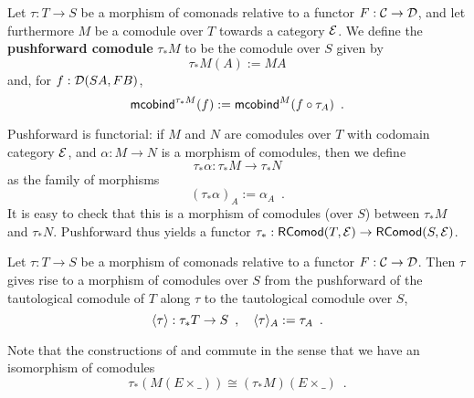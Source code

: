\documentclass{amsart}
\newcommand{\fat}[1]{\textbf{#1}}
\begin{document}
\begin{definition}\label{def:pushforward_comodule} %
  Let $\tau : T\to S$ be a morphism of comonads relative to a functor $F : \C \to \D$, and let furthermore $M$ be a 
  comodule over $T$ towards a category $\E$. We define the \fat{pushforward comodule} $\tau_*M$ to be the comodule over $S$ given by
  \[  \tau_*M(A) := MA \]
  and, for $f : \D(SA,FB)$,
   \[ \mcobind^{\tau_*M}(f) := \mcobind^M(\comp{\tau_A}{f}) \enspace . \]
   
  \noindent
  Pushforward is functorial: if $M$ and $N$ are comodules over $T$ with codomain category $\E$, and $\alpha : M\to N$ is 
    a morphism of comodules, then we define \[\tau_*\alpha : \tau_*M \to \tau_*N\] 
    as the family of morphisms
     \[ (\tau_*\alpha)_A := \alpha_A \enspace . \]
  It is easy to check that this is a morphism of comodules (over $S$) between $\tau_*M$ and $\tau_*N$.
  Pushforward thus yields a functor $\tau_*:\RComod(T,\E) \to \RComod(S,\E)$.
\end{definition}


\begin{definition} %
  Let $\tau : T\to S$ be a morphism of comonads relative to a functor $F : \C \to \D$.
  Then $\tau$ gives rise to a morphism of comodules over $S$ from the pushforward of the tautological comodule
  of $T$ along $\tau$ to the tautological comodule over $S$,
  \[ \induced{\tau} : \tau_*T \to S \enspace , \quad \induced{\tau}_A := \tau_A \enspace . \]
\end{definition}


\begin{remark}\label{rem:prod_pullback_commute}
 Note that the constructions of  and  commute in the sense that
 we have an isomorphism of comodules \[\tau_*(M(E\times \_)) \cong (\tau_*M)(E \times \_) \enspace . \]
\end{remark}
\end{document}
